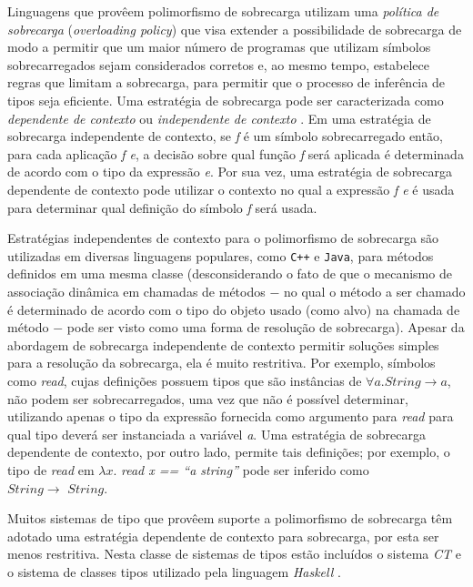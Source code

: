Linguagens que prov\^eem polimorfismo de sobrecarga utilizam uma
\emph{pol\'itica de sobrecarga} (\emph{overloading policy}) que visa extender a possibilidade de
sobrecarga de modo a permitir que um maior n\'umero de programas que utilizam
s\'imbolos sobrecarregados sejam considerados corretos e, ao mesmo tempo,
estabelece regras que limitam a sobrecarga, para permitir que o processo de
infer\^encia de tipos seja eficiente. Uma estrat\'egia de sobrecarga pode ser
caracterizada como \emph{dependente de contexto} ou \emph{independente de
contexto} \cite{Watt90}. Em uma estrat\'egia de sobrecarga independente de
contexto, se \emph{f} \'e um s\'imbolo sobrecarregado ent\~ao, para cada
aplica\c{c}\~ao \emph{f e}, a decis\~ao sobre qual fun\c{c}\~ao \emph{f} ser\'a
aplicada \'e determinada de acordo com o tipo da express\~ao \emph{e}. Por sua
vez, uma estrat\'egia de sobrecarga dependente de contexto pode utilizar o
contexto no qual a express\~ao \emph{f e} \'e usada para determinar qual defini\c{c}\~ao do
s\'imbolo \emph{f} ser\'a usada.

Estrat\'egias independentes de contexto para o polimorfismo de sobrecarga s\~ao
utilizadas em diversas linguagens populares, como \texttt{C++} e \texttt{Java},
para m\'etodos definidos em uma mesma classe (desconsiderando o fato de que o
mecanismo de associa\c{c}\~ao din\^amica em 
chamadas de m\'etodos $-$ no qual o m\'etodo a ser chamado \'e determinado de
acordo com o tipo do objeto usado (como alvo) na chamada de m\'etodo $-$ pode
ser visto como uma forma de resolu\c{c}\~ao de sobrecarga). Apesar da
abordagem de sobrecarga independente de contexto permitir solu\c{c}\~oes simples 
para a resolu\c{c}\~ao da sobrecarga,
ela \'e muito res\-tri\-ti\-va. Por exemplo, s\'imbolos como \emph{read}, cujas
defini\c{c}\~oes possuem tipos que s\~ao inst\^ancias de $\forall a .
String\rightarrow a$, n\~ao podem ser sobrecarregados, uma vez que
n\~ao \'e poss\'ivel determinar, utilizando apenas o tipo da express\~ao
fornecida como argumento para \emph{read} para qual tipo dever\'a ser
instanciada a vari\'avel \emph{a}. Uma estrat\'egia de sobrecarga dependente de
contexto, por outro lado, permite tais defini\c{c}\~oes; por exemplo, o tipo de
\emph{read} em $\lambda x .\,\, $\emph{read x == ``a string''}
pode ser inferido como $String\rightarrow\,\, String$.

Muitos sistemas de tipo que prov\^eem suporte a polimorfismo de sobrecarga t\^em adotado
uma estrat\'egia dependente de contexto para sobrecarga, por esta ser menos
restritiva. Nesta classe de sistemas de tipos est\~ao inclu\'idos o sistema
\emph{CT} \cite{Camarao99a} e o sistema de classes tipos utilizado pela linguagem
\emph{Haskell} \cite{Haskell98, Wadler89}. 

